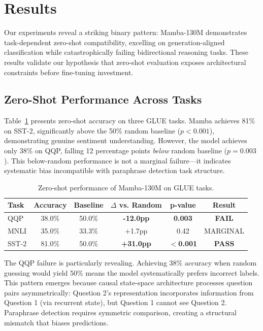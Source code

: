 \section{Results}

Our experiments reveal a striking binary pattern: Mamba-130M demonstrates task-dependent zero-shot compatibility, excelling on generation-aligned classification while catastrophically failing bidirectional reasoning tasks. These results validate our hypothesis that zero-shot evaluation exposes architectural constraints before fine-tuning investment.

\subsection{Zero-Shot Performance Across Tasks}

Table~\ref{tab:results} presents zero-shot accuracy on three GLUE tasks. Mamba achieves 81\% on SST-2, significantly above the 50\% random baseline ($p < 0.001$), demonstrating genuine sentiment understanding. However, the model achieves only 38\% on QQP, falling 12 percentage points \textit{below} random baseline ($p = 0.003$). This below-random performance is not a marginal failure---it indicates systematic bias incompatible with paraphrase detection task structure.

\begin{table}[h]
\centering
\small
\begin{tabular}{lccccc}
\toprule
Task & Accuracy & Baseline & $\Delta$ vs. Random & p-value & Result \\
\midrule
QQP  & 38.0\%    & 50.0\%   & \textbf{-12.0pp}  & \textbf{0.003}   & \textbf{FAIL} \\
MNLI & 35.0\%    & 33.3\%   & +1.7pp            & 0.42             & MARGINAL \\
SST-2& 81.0\%    & 50.0\%   & \textbf{+31.0pp}  & \textbf{$<$0.001}& \textbf{PASS} \\
\bottomrule
\end{tabular}
\caption{Zero-shot performance of Mamba-130M on GLUE tasks.}
\label{tab:results}
\end{table}

The QQP failure is particularly revealing. Achieving 38\% accuracy when random guessing would yield 50\% means the model systematically prefers incorrect labels. This pattern emerges because causal state-space architecture processes question pairs asymmetrically: Question 2's representation incorporates information from Question 1 (via recurrent state), but Question 1 cannot see Question 2. Paraphrase detection requires symmetric comparison, creating a structural mismatch that biases predictions.


